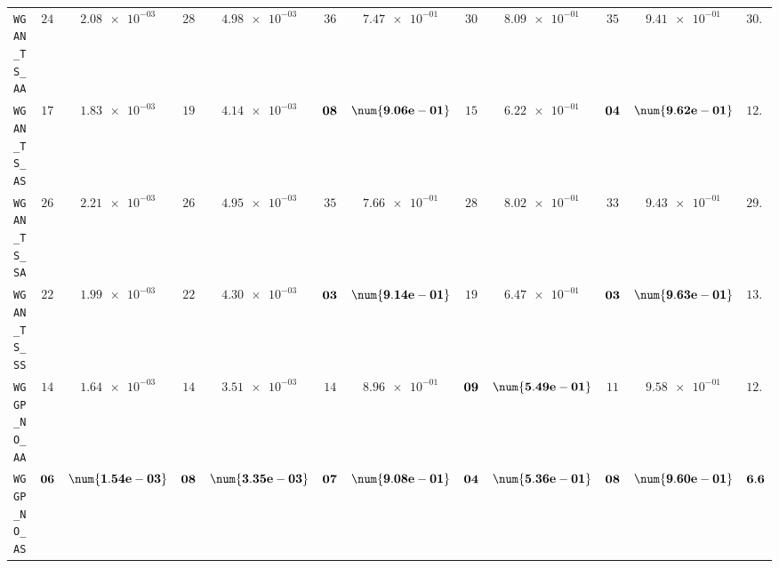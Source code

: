 \begin{xltabular}{\textwidth}{l||cC|cC|cC|cC|cC||c}
	\texttt{WGAN\_TS\_AA} & $ 24$ & $ \num{2.08e-03}$ & $ 28$ & $ \num{4.98e-03}$ & $ 36$ & $ \num{7.47e-01}$ & $ 30$ & $ \num{8.09e-01}$ & $ 35$ & $ \num{9.41e-01}$ & $ 30.6$  \\
	\texttt{WGAN\_TS\_AS} & $ 17$ & $ \num{1.83e-03}$ & $ 19$ & $ \num{4.14e-03}$ & $\bf 08$ & $\bf \num{9.06e-01}$ & $ 15$ & $ \num{6.22e-01}$ & $\bf 04$ & $\bf \num{9.62e-01}$ & $ 12.6$  \\
	\texttt{WGAN\_TS\_SA} & $ 26$ & $ \num{2.21e-03}$ & $ 26$ & $ \num{4.95e-03}$ & $ 35$ & $ \num{7.66e-01}$ & $ 28$ & $ \num{8.02e-01}$ & $ 33$ & $ \num{9.43e-01}$ & $ 29.6$  \\
	\texttt{WGAN\_TS\_SS} & $ 22$ & $ \num{1.99e-03}$ & $ 22$ & $ \num{4.30e-03}$ & $\bf 03$ & $\bf \num{9.14e-01}$ & $ 19$ & $ \num{6.47e-01}$ & $\bf 03$ & $\bf \num{9.63e-01}$ & $ 13.8$  \\ \hline
	\texttt{WGGP\_NO\_AA} & $ 14$ & $ \num{1.64e-03}$ & $ 14$ & $ \num{3.51e-03}$ & $ 14$ & $ \num{8.96e-01}$ & $\bf 09$ & $\bf \num{5.49e-01}$ & $ 11$ & $ \num{9.58e-01}$ & $ 12.4$  \\
	\texttt{WGGP\_NO\_AS} & $\bf 06$ & $\bf \num{1.54e-03}$ & $\bf 08$ & $\bf \num{3.35e-03}$ & $\bf 07$ & $\bf \num{9.08e-01}$ & $\bf 04$ & $\bf \num{5.36e-01}$ & $\bf 08$ & $\bf \num{9.60e-01}$ & $\bf 6.6$  \\

\end{xltabular}
